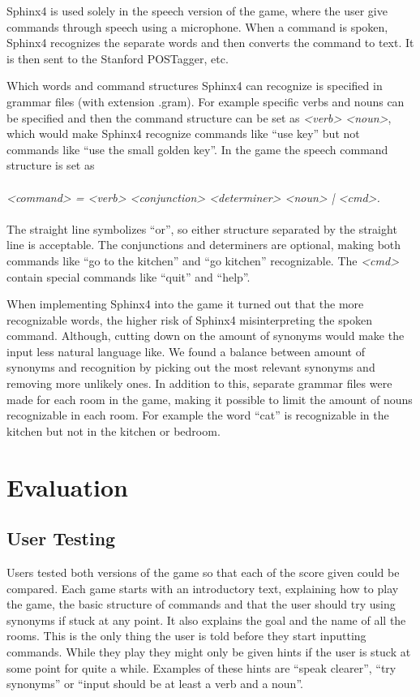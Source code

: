 Sphinx4 is used solely in the speech version of the game, where the user give commands through speech using a microphone. When a command is spoken, Sphinx4 recognizes the separate words and then converts the command to text. It is then sent to the Stanford POSTagger, etc.

Which words and command structures Sphinx4 can recognize is specified in grammar files (with extension .gram). For example specific verbs and nouns can be specified and then the command structure can be set as \textit{<verb> <noun>}, which would make Sphinx4 recognize commands like ``use key'' but not commands like ``use the small golden key''. In the game the speech command structure is set as
\\
\\
\textit{<command> = <verb> <conjunction> <determiner> <noun> | <cmd>.}
\\
\\
The straight line symbolizes ``or'', so either structure separated by the straight line is acceptable. The conjunctions and determiners are optional, making both commands like ``go to the kitchen'' and ``go kitchen'' recognizable. The \textit{<cmd>} contain special commands like ``quit'' and ``help''.

When implementing Sphinx4 into the game it turned out that the more recognizable words, the higher risk of Sphinx4 misinterpreting the spoken command. Although, cutting down on the amount of synonyms would make the input less natural language like. We found a balance between amount of synonyms and recognition by picking out the most relevant synonyms and removing more unlikely ones. In addition to this, separate grammar files were made for each room in the game, making it possible to limit the amount of nouns recognizable in each room. For example the word ``cat'' is recognizable in the kitchen but not in the kitchen or bedroom.

\section{Evaluation}
\subsection{User Testing}
Users tested both versions of the game so that each of the score given could be compared. Each game starts with an introductory text, explaining how to play the game, the basic structure of commands and that the user should try using synonyms if stuck at any point. It also explains the goal and the name of all the rooms. This is the only thing the user is told before they start inputting commands. While they play they might only be given hints if the user is stuck at some point for quite a while. Examples of these hints are ``speak clearer'', ``try synonyms'' or ``input should be at least a verb and a noun''.

